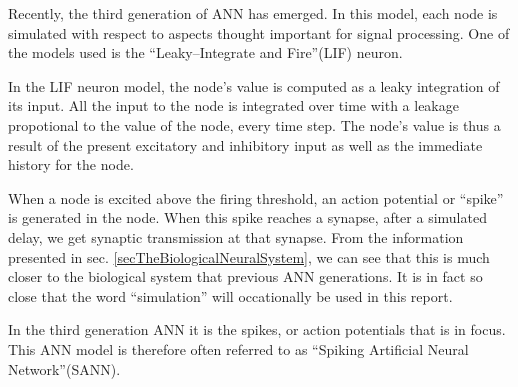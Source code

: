 %
%

Recently, the third generation of ANN has emerged. In this model, each node is simulated with respect to aspects thought important for signal processing\cite{Maass97networksof}.
One of the models used is the ``Leaky--Integrate and Fire''(LIF) neuron. 

In the LIF neuron model, the node's value is computed as a leaky integration of its input. 
All the input to the node is integrated over time with a leakage propotional to the value of the node, every time step.
The node's value is thus a result of the present excitatory and inhibitory input as well as the immediate history for the node.

When a node is excited above the firing threshold, an action potential or ``spike'' is generated in the node. 
When this spike reaches a synapse, after a simulated delay, we get synaptic transmission at that synapse.
From the information presented in sec. \ref{secTheBiologicalNeuralSystem}, we can see that this is much closer to the biological system that previous ANN generations.
It is in fact so close that the word ``simulation'' will occationally be used in this report.

In the third generation ANN it is the spikes, or action potentials that is in focus. %
This ANN model is therefore often referred to as ``Spiking Artificial Neural Network''(SANN).




